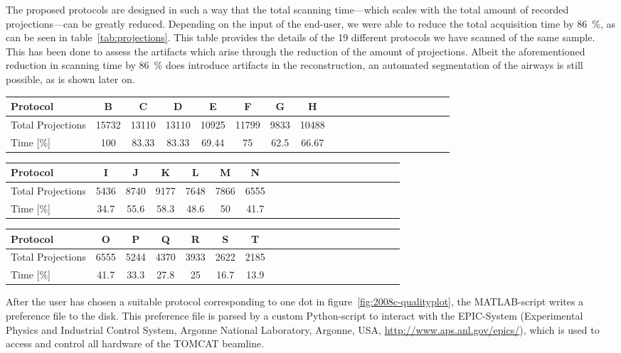 The proposed protocols are designed in such a way that the total scanning time---which scales with the total amount of recorded projections---can be greatly reduced. Depending on the input of the end-user, we were able to reduce the total acquisition time by \SI{86}{\percent}, as can be seen in table~\ref{tab:projections}. This table provides the details of the 19 different protocols we have scanned of the same sample. This has been done to assess the artifacts which arise through the reduction of the amount of projections. Albeit the aforementioned reduction in scanning time by \SI{86}{\percent} does introduce artifacts in the reconstruction, an automated segmentation of the airways is still possible, as is shown later on.

\begin{table*}
	\centering
	\caption{Specification of different protocols and time used compared to gold standard}
	\begin{tabular*}{\textwidth}{l@{\extracolsep\fill}ccccccccccccccccccc}
		\toprule
		Protocol 			& B & C & D & E & F & G & H\\
		\midrule
		Total Projections 	& 15732 & 13110 & 13110 & 10925 & 11799 & 9833 & 10488\\
		Time [\%] 			& 100 & 83.33 & 83.33 & 69.44 & 75 & 62.5 & 66.67\\
		\bottomrule
	\end{tabular*}
	\begin{tabular*}{\textwidth}{l@{\extracolsep\fill}ccccccccccccccccccc}
		\toprule
		Protocol 			& I & J & K & L & M & N \\
		\midrule
		Total Projections 	& 5436 & 8740 & 9177 & 7648 & 7866 & 6555 \\
		Time [\%] 			& 34.7 & 55.6 & 58.3 & 48.6 & 50 & 41.7 \\
 		\bottomrule
	\end{tabular*}
	\begin{tabular*}{\textwidth}{l@{\extracolsep\fill}ccccccccccccccccccc}
		\toprule
		Protocol 			& O & P & Q & R & S & T \\
		\midrule
		Total Projections 	& 6555 & 5244 & 4370 & 3933 & 2622 & 2185 \\
		Time [\%] 			& 41.7 & 33.3 & 27.8 & 25 & 16.7 & 13.9 \\
		\bottomrule
	\end{tabular*}
	\label{tab:projections}
\end{table*}

After the user has chosen a suitable protocol corresponding to one dot in figure~\ref{fig:2008c-qualityplot}, the MATLAB-script writes a preference file to the disk. This preference file is parsed by a custom Python-script to interact with the EPIC-System (Experimental Physics and Industrial Control System, Argonne National Laboratory, Argonne, USA, \url{http://www.aps.anl.gov/epics/}), which is used to access and control all hardware of the TOMCAT beamline.


